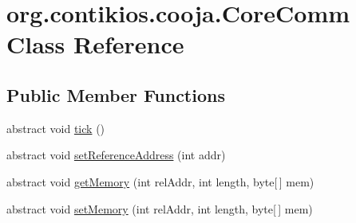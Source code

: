 \hypertarget{classorg_1_1contikios_1_1cooja_1_1CoreComm}{\section{org.\-contikios.\-cooja.\-Core\-Comm Class Reference}
\label{classorg_1_1contikios_1_1cooja_1_1CoreComm}
}
\subsection*{Public Member Functions}
\begin{DoxyCompactItemize}
\item 
abstract void \hyperlink{classorg_1_1contikios_1_1cooja_1_1CoreComm_a6e6496eaaca78e77d975cfb08ebdf27f}{tick} ()
\item 
abstract void \hyperlink{classorg_1_1contikios_1_1cooja_1_1CoreComm_a684a56dd50d0c66e4111e385e09970bb}{set\-Reference\-Address} (int addr)
\item 
abstract void \hyperlink{classorg_1_1contikios_1_1cooja_1_1CoreComm_ace5ee251afbf614f27a7abe3da248d05}{get\-Memory} (int rel\-Addr, int length, byte\mbox{[}$\,$\mbox{]} mem)
\item 
abstract void \hyperlink{classorg_1_1contikios_1_1cooja_1_1CoreComm_a81682a84197a91fe8b54fe80ded9c322}{set\-Memory} (int rel\-Addr, int length, byte\mbox{[}$\,$\mbox{]} mem)
\end{DoxyCompactItemize}
